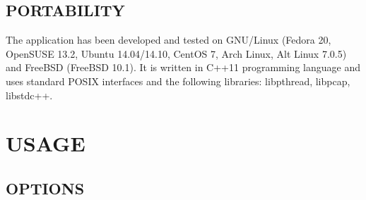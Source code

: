 \documentclass[oneside]{article}
\newcommand{\gls}{}
\begin{document}
\subsection{PORTABILITY}

The application has been developed and tested on GNU/Linux (Fedora 20, OpenSUSE
13.2, Ubuntu 14.04/14.10, CentOS 7, Arch Linux, Alt Linux 7.0.5) and FreeBSD
(FreeBSD 10.1). It is written in C++11 programming language and uses standard
\gls{POSIX} interfaces and the following libraries: libpthread, libpcap,
libstdc++.  

\section{USAGE}
\subsection{OPTIONS}
\end{document}

